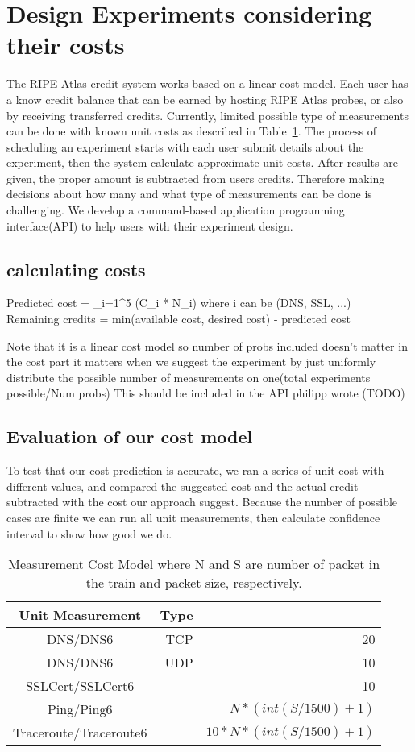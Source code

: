 
\section{Design Experiments considering their costs}

The RIPE Atlas credit system works based on a linear cost model. Each user has a know credit balance that can be earned by hosting RIPE Atlas probes, or also by receiving transferred credits. Currently, limited possible type of measurements can be done with known unit costs as described in Table~\ref{tab:cost}. The process of scheduling an experiment starts with each user submit details about the experiment, then the system calculate approximate unit costs. After results are given, the proper amount is subtracted from users credits. Therefore making decisions about how many and what type of measurements can be done is challenging. We develop a command-based application programming interface(API) to help users with their experiment design. 

\subsection{calculating costs}

Predicted cost = \sum_{i=1}^{5} (C_i * N_i)  where i can be (DNS, SSL, ...)\\
Remaining credits = min(available cost, desired cost) - predicted cost

Note that it is a linear cost model so number of probs included doesn't matter in the cost part it matters when we suggest the experiment by just uniformly distribute the possible number of measurements on one(total experiments possible/Num probs)
This should be included in the API philipp wrote (TODO)

\subsection{Evaluation of our cost model}
To test that our cost prediction is accurate, we ran a series of unit cost with different values, and compared  the suggested cost and the actual credit subtracted with the cost our approach suggest. Because the number of possible cases are finite we can run all unit measurements, then calculate confidence interval to show how good we do.
\begin{table}[h] 

\hspace{2in}
\centering 
\begin{tabular}{c rr} 
\hline\hline 
Unit Measurement& Type \multicolumn{3}{c}{Cost} \\ [0.5ex] 
\hline 
DNS\slash DNS6 & TCP & 20\\ 
DNS\slash DNS6 & UDP & 10\\ 
SSLCert\slash SSLCert6 & & 10 \\
Ping\slash Ping6 & & $N * (int(S/1500)+1)$\\
Traceroute\slash Traceroute6 & & $ 10*N*(int(S/1500)+1)$\\[1ex] 
\hline 
\end{tabular} 
\caption{Measurement Cost Model where N and S are number of packet in the train and packet size, respectively.} 
\label{tab:cost} 
\end{table} 
